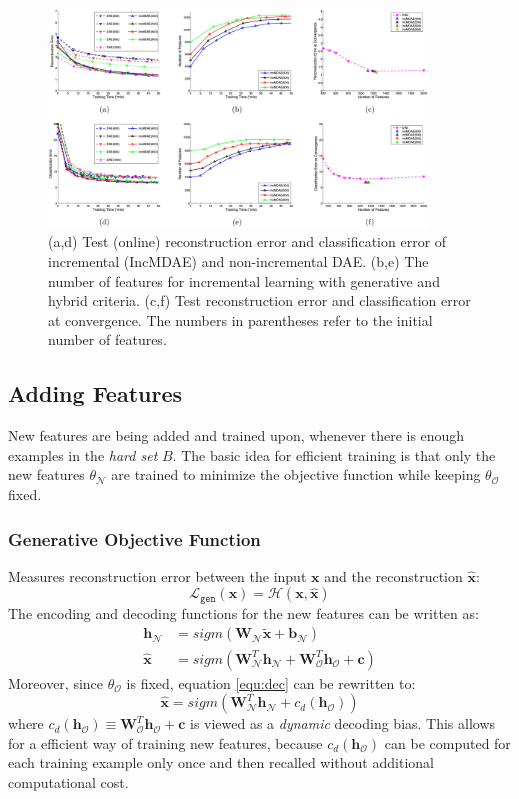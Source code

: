 \documentclass[a4paper,twocolumn]{article}
\renewcommand{\H}{\mathcal{H}}
\newcommand{\N}{\mathcal{N}}
\renewcommand{\L}{\mathcal{L}}
\renewcommand{\O}{\mathcal{O}}
\newcommand{\Lgen}{\L_{\mathtt{gen}}}
\begin{document}
\begin{figure}[t]
    \centering
    \includegraphics[width=0.9\textwidth]{graph.png}
    \caption{(a,d) Test (online) reconstruction error and classification error of incremental (IncMDAE) and non-incremental DAE. (b,e) The number of features for incremental learning with generative and hybrid criteria. (c,f) Test reconstruction error and classification error at convergence. The numbers in parentheses refer to the initial number of features.}
    \label{fig:graph}
\end{figure}

\subsection{Adding Features} \label{ssec:adding}
New features are being added and trained upon, whenever there is enough examples in the \textit{hard set} $B$.
The basic idea for efficient training is that only the new features $\theta_\N$ are trained to minimize the objective function while keeping $\theta_\O$ fixed.

\subsubsection{Generative Objective Function}
Measures reconstruction error between the input $\mathbf{x}$ and the reconstruction $\mathbf{\widehat{x}}$:
\begin{equation}
    \Lgen(\mathbf{x}) = \H(\mathbf{x}, \mathbf{\widehat{x}})
\end{equation}
The encoding and decoding functions for the new features can be written as:
\begin{align}
    \mathbf{h}_\N &= sigm(\mathbf{W_\N \widetilde{x}} + \mathbf{b_\N}) \\
 \label{equ:dec}
    \mathbf{\widehat{x}} &= sigm(\mathbf{W}_\N^T\mathbf{h}_\N + \mathbf{W}_\O^T\mathbf{h}_\O + \mathbf{c})
\end{align}
Moreover, since $\theta_\O$ is fixed, equation \eqref{equ:dec} can be rewritten to:
\begin{equation}
    \mathbf{\widehat{x}} = sigm(\mathbf{W}_\N^T\mathbf{h}_\N + c_d(\mathbf{h}_\O))
\end{equation}
where $c_d(\mathbf{h}_\O) \equiv \mathbf{W}_\O^T\mathbf{h}_\O + \mathbf{c}$ is viewed as a \textit{dynamic} decoding bias.
This allows for a efficient way of training new features, because $c_d(\mathbf{h}_\O)$ can be computed for each training example only once and then recalled without additional computational cost.
\end{document}
